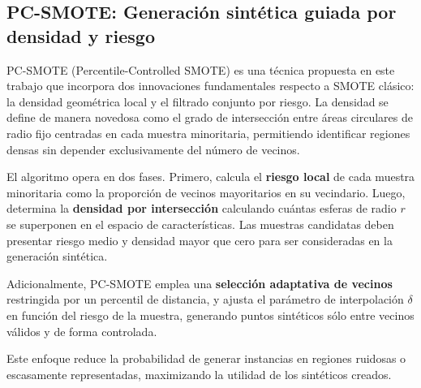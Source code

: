 
\subsection{PC-SMOTE: Generación sintética guiada por densidad y riesgo}

PC-SMOTE (Percentile-Controlled SMOTE) es una técnica propuesta en este trabajo que incorpora dos innovaciones fundamentales respecto a SMOTE clásico: la densidad geométrica local y el filtrado conjunto por riesgo. La densidad se define de manera novedosa como el grado de intersección entre áreas circulares de radio fijo centradas en cada muestra minoritaria, permitiendo identificar regiones densas sin depender exclusivamente del número de vecinos.

El algoritmo opera en dos fases. Primero, calcula el \textbf{riesgo local} de cada muestra minoritaria como la proporción de vecinos mayoritarios en su vecindario. Luego, determina la \textbf{densidad por intersección} calculando cuántas esferas de radio $r$ se superponen en el espacio de características. Las muestras candidatas deben presentar riesgo medio y densidad mayor que cero para ser consideradas en la generación sintética.

Adicionalmente, PC-SMOTE emplea una \textbf{selección adaptativa de vecinos} restringida por un percentil de distancia, y ajusta el parámetro de interpolación $\delta$ en función del riesgo de la muestra, generando puntos sintéticos sólo entre vecinos válidos y de forma controlada.

Este enfoque reduce la probabilidad de generar instancias en regiones ruidosas o escasamente representadas, maximizando la utilidad de los sintéticos creados.


